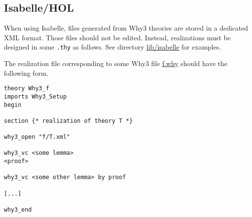 \subsection{Isabelle/HOL}



When using Isabelle, files generated from Why3 theories are stored in
a dedicated XML format. Those files should not be edited. Instead,
realizations must be designed in some \texttt{.thy} as follows. See
directory \url{lib/isabelle} for examples.

The realization file corresponding to some Why3 file \url{f.why}
should have the following form. 
\begin{verbatim}
theory Why3_f
imports Why3_Setup
begin

section {* realization of theory T *}

why3_open "f/T.xml"

why3_vc <some lemma> 
<proof>

why3_vc <some other lemma> by proof

[...]

why3_end
\end{verbatim}

